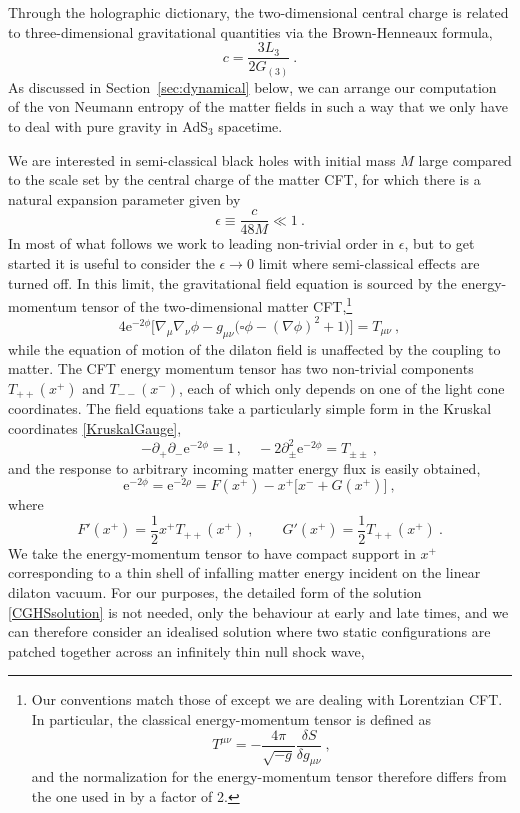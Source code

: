 \documentclass[12pt,a4paper]{article}
\newcommand{\e}{\mathrm{e}}
\newcommand{\be}{\begin{equation}}
\newcommand{\ee}{\end{equation}}
\newcommand{\f}[2]{\frac{#1}{#2}}
\begin{document}
Through the holographic dictionary, the two-dimensional central charge is related to three-dimensional gravitational quantities via the Brown-Henneaux formula,
\be
c = \f{3 L_3}{2G_{(3)}}~.
\ee
As discussed in Section~\ref{sec:dynamical} below, we can arrange our computation of the von Neumann entropy of the matter fields in such a way that we only have to deal with pure gravity in AdS$_3$ spacetime.

We are interested in semi-classical black holes with initial mass $M$ large compared to the scale set by the central charge of the matter CFT, for which there is a natural expansion parameter given by
\be
\epsilon\equiv\f{c}{48M}\ll 1~.
\label{epsilonparameter}
\ee
In most of what follows we work to leading non-trivial order in $\epsilon$, but to get started it is useful to consider the $\epsilon\rightarrow 0$ limit where semi-classical effects are turned off. In this limit, the gravitational field equation is sourced by the energy-momentum tensor of the two-dimensional matter CFT,\footnote{Our conventions match those of \cite{Polchinski:1998rq} except we are dealing with Lorentzian CFT. In particular, the classical energy-momentum tensor is defined as
\be
T^{\mu\nu} = -\f{4\pi}{\sqrt{-g}} \f{\delta S}{\delta g_{\mu\nu}}~,
\ee
and the normalization for the energy-momentum tensor therefore differs from the one used in \cite{Callan:1992rs} by a factor of 2.}
\be
4\e^{-2\phi}\Big[\nabla_\mu\nabla_\nu\phi - g_{\mu\nu}\big(\square \phi-(\nabla\phi)^2+1\big)\Big]=T_{\mu\nu}~,
\ee
while the equation of motion of the dilaton field is unaffected by the coupling to matter. The CFT energy momentum tensor has two non-trivial components $T_{++}(x^+)$ and $T_{--}(x^-)$, each of which only depends on one of the light cone coordinates.
The field equations take a particularly simple form in the Kruskal coordinates \eqref{KruskalGauge},
\be\label{CGHSnobackreactionEOM}
-\partial_+\partial_- \e^{-2\phi} =1 \,,\quad -2\partial_\pm^2  \e^{-2\phi}= T_{\pm\pm}~,
\ee
and the response to arbitrary incoming matter energy flux is easily obtained, 
\be\label{CGHSsolution}
\e^{-2\phi} = \e^{-2\rho}=F(x^+) - x^+\big[x^-+G(x^+)\big]~,
\ee
where
\be\label{FGCGHSeqs}
F'(x^+) = \f12{x^+ T_{++}(x^+)} ~,\qquad G'(x^+) = \f12{T_{++}(x^+)}~.
\ee
We take the energy-momentum tensor to have compact support in $x^+$ corresponding to a thin shell of infalling matter energy incident on the linear dilaton vacuum. For our purposes, the detailed form of the solution \eqref{CGHSsolution} is not needed, only the behaviour at early and late times, and we can therefore consider an idealised solution where two static configurations are patched together across an infinitely thin null shock wave,
\end{document}
